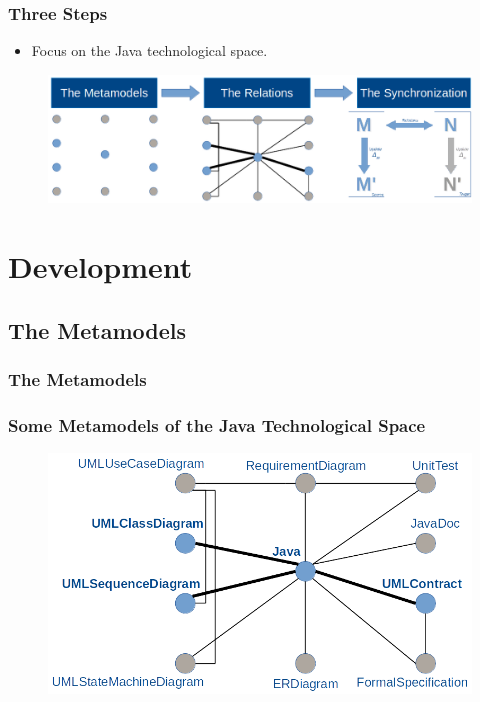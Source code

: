 \documentclass{beamer}
\begin{document}
\begin{frame}[t]
	\frametitle{Three Steps}
	\begin{itemize}
		\item Focus on the Java technological space.
	\end{itemize}
	\pause
	\begin{figure}
		\vskip -5pt
		\includegraphics[scale=0.3]{objective}
	\end{figure}
\end{frame}

\section{Development} %
\subsection{The Metamodels}
\begin{frame}
	\frametitle{The Metamodels}
\end{frame}

\begin{frame}
	\frametitle{Some Metamodels of the Java Technological Space}
	\begin{figure}
		\vskip -5pt
		\includegraphics[scale=0.3]{network_metamodels_java}
	\end{figure}
\end{frame}
\end{document}

